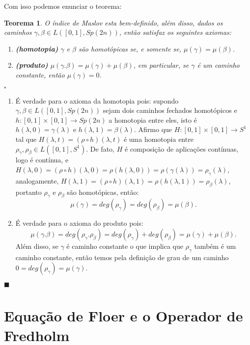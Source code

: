 \documentclass[12pt]{book}
\newtheorem{teorema}{Teorema}[section]
\newenvironment{prova}[1]{$\square$ #1}{\hfill$\blacksquare$}
\newcommand{\caminhosfechadoscirculo}[2]{L([#1,#2], S^{1})}
\newcommand{\caminhosfechadosSp}[2]{L([#1,#2], \gruposimpletico{2n})}
\newcommand{\gruposimpletico}[1]{Sp(#1)}
\begin{document}
	Com isso podemos enunciar o teorema:
		
	\begin{teorema}\label{teorema_indice_maslov}
		O índice de Maslov esta bem-definido, além disso, dados os caminhos $\gamma, \beta \in \caminhosfechadosSp{0}{1}$, então satisfaz os seguintes axiomas:
		\begin{enumerate}
			\item \textbf{(homotopia)} $\gamma$ e $\beta$ são homotópicas se, e somente se, $\mu(\gamma)=\mu(\beta)$.
			
			\item \textbf{(produto)} $\mu(\gamma.\beta) = \mu(\gamma)+\mu(\beta)$, em particular, se $\gamma$ é um caminho constante, então $\mu(\gamma) = 0$.
		\end{enumerate}
	\end{teorema}
	\begin{prova}
		\begin{enumerate}
			\item É verdade para o axioma da homotopia pois: supondo $\gamma, \beta \in \caminhosfechadosSp{0}{1}$ sejam dois caminhos fechados homotópicos e $h:[0,1]\times [0,1]\to \gruposimpletico{2n}$ a homotopia entre eles, isto é $h(\lambda, 0) = \gamma(\lambda)$ e $h(\lambda, 1) = \beta(\lambda)$. Afirmo que $H:[0,1] \times [0,1] \to S^{1}$ tal que $H(\lambda, t) = (\rho \circ h)(\lambda,t)$ é uma homotopia entre $\rho_{\gamma}, \rho_{\beta} \in \caminhosfechadoscirculo{0}{1}$. De fato, $H$ é composição de aplicações contínuas, logo é contínua, e $H(\lambda, 0) = (\rho \circ h)(\lambda,0) = \rho (h(\lambda,0))= \rho (\gamma(\lambda)) = \rho_{\gamma}(\lambda)$, analogamente, $H(\lambda, 1) = (\rho \circ h)(\lambda, 1) = \rho (h(\lambda,1))= \rho_{\beta}(\lambda)$, portanto $\rho_{\gamma}$ e $\rho_{\beta}$ são homotópicas, então:
			$$
			\mu(\gamma) = deg(\rho_{\gamma}) = deg(\rho_{\beta}) = \mu(\beta).
			$$
			\item É verdade para o axioma do produto pois:
			$$
			\mu(\gamma.\beta) = deg(\rho_{\gamma}.\rho_{\beta}) = deg(\rho_{\gamma})+deg(\rho_{\beta}) = \mu(\gamma)+\mu(\beta).
			$$	
			Além disso, se $\gamma$ é caminho constante o que implica que $\rho_{\gamma}$ também é um caminho constante, então temos pela definição de grau de um caminho $0=deg(\rho_{\gamma}) = \mu(\gamma)$.
		\end{enumerate}
	\end{prova}
	
	\chapter{Equação de Floer e o Operador de Fredholm}
\end{document}

